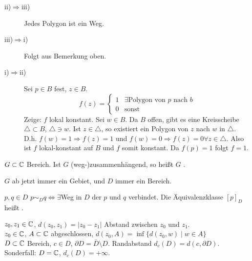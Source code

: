 \begin{beweis}
	\begin{description}
		\item[ii)$ \Rightarrow $iii)] Jedes Polygon ist ein Weg.
		\item[iii)$ \Rightarrow $i)] Folgt aus Bemerkung oben.
		\item[i)$ \Rightarrow $ii)] Sei $ p\in B $ fest, $ z\in B $.
		\[ f(z)=\begin{cases}
		1&  \exists \text{Polygon von }  p  \text{ nach }  b \\0& \text{sonst}
		\end{cases} \]
		Zeige: $ f $ lokal konstant. Sei $ w\in B $. Da $ B $ offen, gibt es eine Kreisscheibe $ \triangle\subset B $, $ \triangle\ni w $. Ist $ z\in\triangle $, so existiert ein Polygon von $ z $ nach $ w $ in $ \triangle $. D.h. $ f(w)=1\Rightarrow f(z)=1 $ und $ f(w)=0\Rightarrow f(z)=0 \forall z\in\triangle$. Also ist $ f $ lokal-konstant auf $ B $ und $ f $ somit konstant. Da $ f(p)=1 $ folgt $ f=1 $.
	\end{description}
\end{beweis}
\newpage
\begin{definition}
	$ G\subset\mathbb{C} $ Bereich. Ist $ G $ (weg-)zusammenh\"angend, so hei\ss t $ G $ .
\end{definition}
$ G $ ab jetzt immer ein Gebiet, und $ D $ immer ein Bereich.\\
\begin{definition}
	$ p,q\in D $ $ p\sim_D q \Leftrightarrow\exists$Weg in $ D $ der $ p $ und $ q $ verbindet. Die \"Aquivalenzklasse $ [p]_D $ hei\ss t .
\end{definition}
$ z_0,z_1\in\mathbb{C} $, $ d(z_0,z_1)=|z_0-z_1| $ Abstand zwischen $ z_0 $ und $ z_1 $.\\
$ z_0\in\mathbb{C} $, $ A\subset\mathbb{C} $ abgeschlossen, $ d(z_0,A)=\inf\lbrace d(z_0,w)\mid w\in A\rbrace $\\
$ D\subset\mathbb{C} $ Bereich, $ c\in D $, $ \partial D=\bar D\setminus D $. Randabstand $ d_c(D)=d(c,\partial D) $.\\
Sonderfall: $ D=\mathbb{C} $, $ d_c(D)=+\infty $.